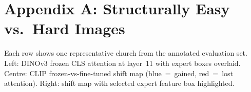 \documentclass{article}
\begin{document}


\clearpage
\onecolumn

\appendix
\section*{Appendix A: Structurally Easy vs.\ Hard Images}

Each row shows one representative church from the annotated evaluation set. Left:
DINOv3 frozen CLS attention at layer~11 with expert boxes overlaid. Centre: CLIP
frozen-vs-fine-tuned shift map (blue~=~gained, red~=~lost attention). Right:
shift map with selected expert feature box highlighted.
\end{document}
